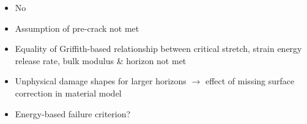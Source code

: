 \begin{frame}[t]{\secname}{\subsecname{}}

\begin{itemize}
  \item No
  \item Assumption of pre-crack not met
  \item Equality of Griffith-based relationship between critical stretch, strain energy release rate, bulk modulus \& horizon not met
  \item Unphysical damage shapes for larger horizons $\rightarrow$ effect of missing surface correction in material model
  \item Energy-based failure criterion?
\end{itemize}

\end{frame}